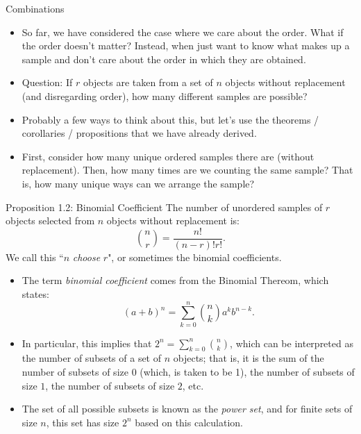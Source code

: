 \begin{frame}[allowframebreaks]{Combinations}

  \begin{itemize}
    \item So far, we have considered the case where we care about the order. What if the order doesn't matter? Instead, when just want to know what makes up a sample and don't care about the order in which they are obtained. 
  
    \item \alert{Question}: If $r$ objects are taken from a set of $n$ objects without replacement (and disregarding order), how many different samples are possible?
  
    \item Probably a few ways to think about this, but let's use the theorems / corollaries / propositions that we have already derived.
    \item First, consider how many unique ordered samples there are (without replacement). Then, how many times are we counting the same sample? That is, how many unique ways can we arrange the sample?
  
\end{itemize}


\framebreak

\begin{block}{Proposition 1.2: Binomial Coefficient}
  The number of unordered samples of $r$ objects selected from $n$ objects without replacement is:
  $$
  \binom{n}{r} = \frac{n!}{(n-r)!r!}.
  $$
  We call this ``$n$ \emph{choose} $r$", or sometimes the binomial coefficients.
\end{block}

\begin{itemize}
  \item The term \emph{binomial coefficient} comes from the Binomial Thereom, which states: 
$$
(a + b)^n = \sum_{k = 0}^n \binom{n}{k}a^kb^{n-k}.
$$
  \item In particular, this implies that $2^n = \sum_{k = 0}^n \binom{n}{k}$, which can be interpreted as the number of subsets of a set of $n$ objects; that is, it is the sum of the number of subsets of size $0$ (which, is taken to be 1), the number of subsets of size $1$, the number of subsets of size $2$, etc. 
  \item The set of all possible subsets is known as the \emph{power set}, and for finite sets of size $n$, this set has size $2^n$ based on this calculation.
\end{itemize}
  
\end{frame}

